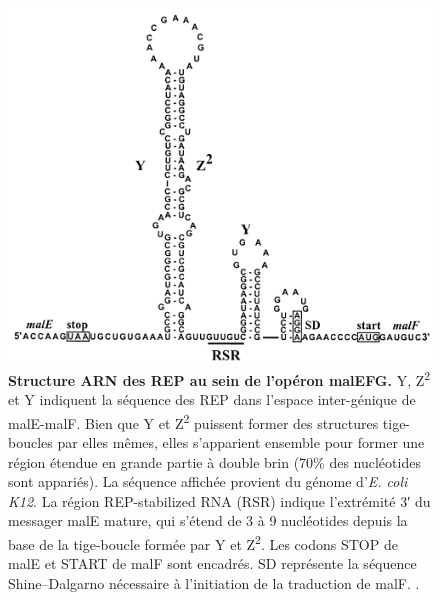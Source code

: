\documentclass[12pt,a4paper]{report}
\begin{document}
\begin{onehalfspace}
\begin{figure}[ht]
\centerline{\includegraphics[scale=0.5]{figures/malEF_rep.png}}
\caption{\textbf{Structure ARN des REP au sein de l’opéron malEFG.} Y, Z\textsuperscript{2} et Y indiquent la séquence des REP dans l'espace inter-génique de malE-malF. Bien que Y et Z\textsuperscript{2} puissent former des structures tige-boucles par elles mêmes, elles s'apparient ensemble pour former une région étendue en grande partie à double brin (70\% des nucléotides sont appariés). La séquence affichée provient du génome d'\textit{E. coli K12}. La région REP-stabilized RNA (RSR) indique l'extrémité 3′ du messager malE mature, qui s'étend de 3 à 9 nucléotides depuis la base de la tige-boucle formée par Y et Z\textsuperscript{2}. Les codons STOP de  malE et START de malF sont encadrés. SD représente la séquence Shine–Dalgarno nécessaire à l'initiation de la traduction de malF. \citep{Khemici2004}.}
\label{fig:malEF_rep} 
\end{figure}


\end{onehalfspace}
\end{document}
